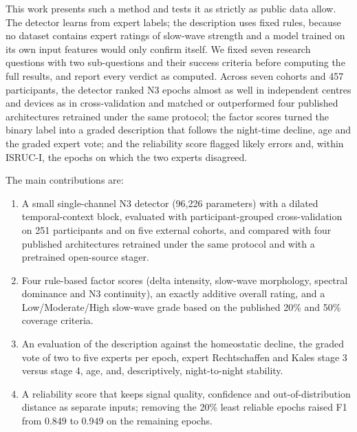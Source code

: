 This work presents such a method and tests it as strictly as public data allow. The detector learns from expert labels; the description uses fixed rules, because no dataset contains expert ratings of slow-wave strength and a model trained on its own input features would only confirm itself. We fixed seven research questions with two sub-questions and their success criteria before computing the full results, and report every verdict as computed. Across seven cohorts and 457 participants, the detector ranked N3 epochs almost as well in independent centres and devices as in cross-validation and matched or outperformed four published architectures retrained under the same protocol; the factor scores turned the binary label into a graded description that follows the night-time decline, age and the graded expert vote; and the reliability score flagged likely errors and, within ISRUC-I, the epochs on which the two experts disagreed.

The main contributions are:
\begin{enumerate}
\item A small single-channel N3 detector (96,226 parameters) with a dilated temporal-context block, evaluated with participant-grouped cross-validation on 251 participants and on five external cohorts, and compared with four published architectures retrained under the same protocol and with a pretrained open-source stager. %
\item Four rule-based factor scores (delta intensity, slow-wave morphology, spectral dominance and N3 continuity), an exactly additive overall rating, and a Low/Moderate/High slow-wave grade based on the published 20\% and 50\% coverage criteria.
\item An evaluation of the description against the homeostatic decline, the graded vote of two to five experts per epoch, expert Rechtschaffen and Kales stage 3 versus stage 4, age, and, descriptively, night-to-night stability.
\item A reliability score that keeps signal quality, confidence and out-of-distribution distance as separate inputs; removing the 20\% least reliable epochs raised F1 from 0.849 to 0.949 on the remaining epochs. %
\end{enumerate}
